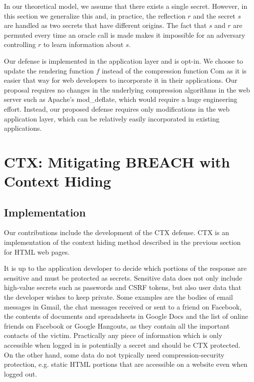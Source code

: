 In our theoretical model, we assume that there exists a single secret. However,
in this section we generalize this and, in practice, the reflection $r$ and the
secret $s$ are handled as two secrets that have different origins. The fact
that $s$ and $r$ are permuted every time an oracle call is made makes it
impossible for an adversary controlling $r$ to learn information about $s$.

Our defense is implemented in the application layer and is opt-in. We choose to
update the rendering function $f$ instead of the compression function
$\textrm{Com}$ as it is easier that way for web developers to incorporate it in
their applications. Our proposal requires no changes in the underlying
compression algorithms in the web server such as Apache's mod\_deflate, which
would require a huge engineering effort. Instead, our proposed defense requires
only modifications in the web application layer, which can be relatively easily
incorporated in existing applications.

\section{CTX: Mitigating BREACH with Context Hiding }\label{sec:ctx}

\subsection{Implementation}
Our contributions include the development of the CTX defense. CTX is an
implementation of the context hiding method described in the previous section
for HTML web pages.

It is up to the application developer to decide which portions of the response
are sensitive and must be protected as secrets. Sensitive data does not only
include high-value secrets such as passwords and CSRF tokens, but also user data
that the developer wishes to keep private. Some examples are the bodies of email
messages in Gmail, the chat messages received or sent to a friend on Facebook,
the contents of documents and spreadsheets in Google Docs and the list of online
friends on Facebook or Google Hangouts, as they contain all the important
contacts of the victim. Practically any piece of information which is only
accessible when logged in is potentially a secret and should be CTX protected.
On the other hand, some data do not typically need compression-security
protection, e.g. static HTML portions that are accessible on a website even when
logged out.

